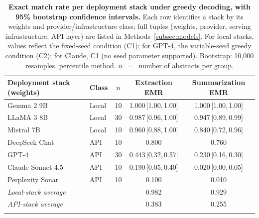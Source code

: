 \documentclass[sn-nature]{sn-jnl}
\providecommand{\DIFaddbeginFL}{} %
\providecommand{\DIFaddendFL}{} %
\providecommand{\DIFaddincludegraphics}[2][]{{\color{blue}\fbox{\DIFOincludegraphics[#1]{#2}}}} %
\DeclareRobustCommand{\DIFaddbeginFL}{\DIFOaddbeginFL \let\includegraphics\DIFaddincludegraphics} %
\DeclareRobustCommand{\DIFaddendFL}{\DIFOaddendFL \let\includegraphics\DIFOincludegraphics} %
\begin{document}
\begin{table}[t]
\caption{\textbf{Exact match rate per deployment stack under greedy decoding, with 95\% bootstrap confidence intervals.}
Each row identifies a stack by its weights and provider/infrastructure class; full tuples (weights, provider, serving infrastructure, API layer) are listed in Methods~\ref{subsec:models}.
For local stacks, values reflect the fixed-seed condition (C1); for GPT-4, the variable-seed greedy condition (C2); for Claude, C1 (no seed parameter supported).
Bootstrap: 10\DIFaddbeginFL {\DIFaddendFL ,\DIFaddbeginFL }\DIFaddendFL 000 resamples, percentile method.
$n$~$=$~number of abstracts per group.}\label{tab:main}
\footnotesize
\begin{tabular}{@{}llccc@{}}
\toprule
\textbf{Deployment stack (weights)} & \textbf{Class} & \textbf{$n$} & \textbf{Extraction EMR} & \textbf{Summarization EMR} \\
\midrule
Gemma 2 9B      & Local & 10 & 1.000\,[1.00,\,1.00] & 1.000\,[1.00,\,1.00] \\
LLaMA 3 8B      & Local & 30 & 0.987\,[0.96,\,1.00] & 0.947\,[0.89,\,0.99] \\
Mistral 7B      & Local & 10 & 0.960\,[0.88,\,1.00] & 0.840\,[0.72,\,0.96] \\
\midrule
DeepSeek Chat   & API   & 10 & 0.800 & 0.760 \\
GPT-4           & API   & 30 & 0.443\,[0.32,\,0.57] & 0.230\,[0.16,\,0.30] \\
Claude Sonnet 4.5 & API & 10 & 0.190\,[0.05,\,0.40] & 0.020\,[0.00,\,0.05] \\
Perplexity Sonar & API  & 10 & 0.100 & 0.010 \\
\midrule
\multicolumn{2}{l}{\textit{Local-stack average}} & & 0.982 & 0.929 \\
\multicolumn{2}{l}{\textit{API-stack average}}   & & 0.383 & 0.255 \\
\botrule
\end{tabular}
\normalsize
\end{table}
\end{document}
